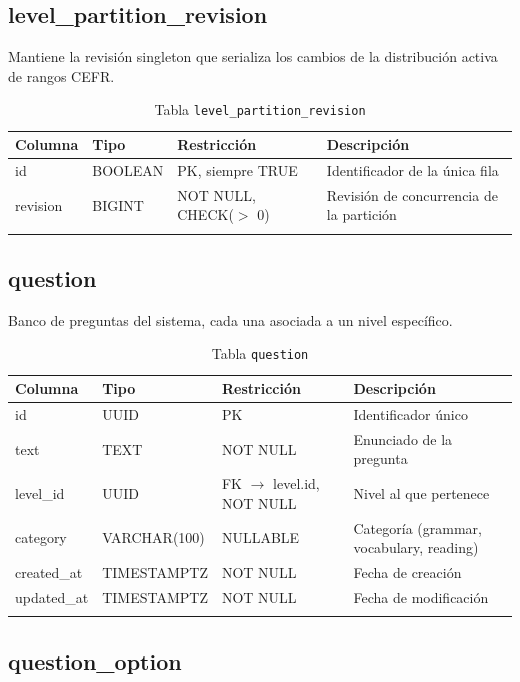\subsection{level\_partition\_revision}

Mantiene la revisión singleton que serializa los cambios de la distribución activa de rangos CEFR.

\begin{longtable}{l l l p{5cm}}
\toprule
\textbf{Columna} & \textbf{Tipo} & \textbf{Restricción} & \textbf{Descripción} \\
\midrule
\endhead
id & BOOLEAN & PK, siempre TRUE & Identificador de la única fila \\
revision & BIGINT & NOT NULL, CHECK($>$ 0) & Revisión de concurrencia de la partición \\
\bottomrule
\caption{Tabla \texttt{level\_partition\_revision}}
\end{longtable}

\newpage

\subsection{question}

Banco de preguntas del sistema, cada una asociada a un nivel específico.

\begin{longtable}{l l l p{5cm}}
\toprule
\textbf{Columna} & \textbf{Tipo} & \textbf{Restricción} & \textbf{Descripción} \\
\midrule
\endhead
id & UUID & PK & Identificador único \\
text & TEXT & NOT NULL & Enunciado de la pregunta \\
level\_id & UUID & FK $\rightarrow$ level.id, NOT NULL & Nivel al que pertenece \\
category & VARCHAR(100) & NULLABLE & Categoría (grammar, vocabulary, reading) \\
created\_at & TIMESTAMPTZ & NOT NULL & Fecha de creación \\
updated\_at & TIMESTAMPTZ & NOT NULL & Fecha de modificación \\
\bottomrule
\caption{Tabla \texttt{question}}
\end{longtable}

\subsection{question\_option}

